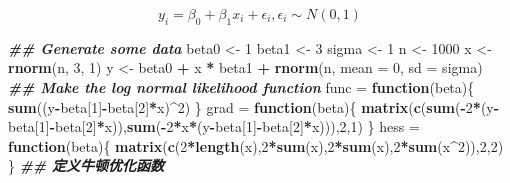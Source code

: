 \documentclass[
]{book}
\newenvironment{Shaded}{\begin{snugshade}}{\end{snugshade}}
\newcommand{\AttributeTok}[1]{\textcolor[rgb]{0.13,0.29,0.53}{#1}}
\newcommand{\ControlFlowTok}[1]{\textcolor[rgb]{0.13,0.29,0.53}{\textbf{#1}}}
\newcommand{\DecValTok}[1]{\textcolor[rgb]{0.00,0.00,0.81}{#1}}
\newcommand{\DocumentationTok}[1]{\textcolor[rgb]{0.56,0.35,0.01}{\textbf{\textit{#1}}}}
\newcommand{\FunctionTok}[1]{\textcolor[rgb]{0.13,0.29,0.53}{\textbf{#1}}}
\newcommand{\NormalTok}[1]{#1}
\newcommand{\OtherTok}[1]{\textcolor[rgb]{0.56,0.35,0.01}{#1}}
\newcommand{\SpecialCharTok}[1]{\textcolor[rgb]{0.81,0.36,0.00}{\textbf{#1}}}
\begin{document}
\begin{enumerate}
  \[
  y_i = \beta_0 + \beta_1x_i+\epsilon_i,\epsilon_i\sim N(0,1)
  \]

\begin{Shaded}
\begin{Highlighting}[]
\DocumentationTok{\#\# Generate some data}
\NormalTok{beta0 }\OtherTok{\textless{}{-}} \DecValTok{1}
\NormalTok{beta1 }\OtherTok{\textless{}{-}} \DecValTok{3}
\NormalTok{sigma }\OtherTok{\textless{}{-}} \DecValTok{1}
\NormalTok{n }\OtherTok{\textless{}{-}} \DecValTok{1000}
\NormalTok{x }\OtherTok{\textless{}{-}} \FunctionTok{rnorm}\NormalTok{(n, }\DecValTok{3}\NormalTok{, }\DecValTok{1}\NormalTok{)}
\NormalTok{y }\OtherTok{\textless{}{-}}\NormalTok{ beta0 }\SpecialCharTok{+}\NormalTok{ x }\SpecialCharTok{*}\NormalTok{ beta1 }\SpecialCharTok{+} \FunctionTok{rnorm}\NormalTok{(n, }\AttributeTok{mean =} \DecValTok{0}\NormalTok{, }\AttributeTok{sd =}\NormalTok{ sigma)}
\DocumentationTok{\#\# Make the log normal likelihood function}
\NormalTok{func }\OtherTok{=} \ControlFlowTok{function}\NormalTok{(beta)\{}
  \FunctionTok{sum}\NormalTok{((y}\SpecialCharTok{{-}}\NormalTok{beta[}\DecValTok{1}\NormalTok{]}\SpecialCharTok{{-}}\NormalTok{beta[}\DecValTok{2}\NormalTok{]}\SpecialCharTok{*}\NormalTok{x)}\SpecialCharTok{\^{}}\DecValTok{2}\NormalTok{)}
\NormalTok{\}}
\NormalTok{grad }\OtherTok{=} \ControlFlowTok{function}\NormalTok{(beta)\{}
  \FunctionTok{matrix}\NormalTok{(}\FunctionTok{c}\NormalTok{(}\FunctionTok{sum}\NormalTok{(}\SpecialCharTok{{-}}\DecValTok{2}\SpecialCharTok{*}\NormalTok{(y}\SpecialCharTok{{-}}\NormalTok{beta[}\DecValTok{1}\NormalTok{]}\SpecialCharTok{{-}}\NormalTok{beta[}\DecValTok{2}\NormalTok{]}\SpecialCharTok{*}\NormalTok{x)),}\FunctionTok{sum}\NormalTok{(}\SpecialCharTok{{-}}\DecValTok{2}\SpecialCharTok{*}\NormalTok{x}\SpecialCharTok{*}\NormalTok{(y}\SpecialCharTok{{-}}\NormalTok{beta[}\DecValTok{1}\NormalTok{]}\SpecialCharTok{{-}}\NormalTok{beta[}\DecValTok{2}\NormalTok{]}\SpecialCharTok{*}\NormalTok{x))),}\DecValTok{2}\NormalTok{,}\DecValTok{1}\NormalTok{)}
\NormalTok{\}}
\NormalTok{hess }\OtherTok{=} \ControlFlowTok{function}\NormalTok{(beta)\{}
  \FunctionTok{matrix}\NormalTok{(}\FunctionTok{c}\NormalTok{(}\DecValTok{2}\SpecialCharTok{*}\FunctionTok{length}\NormalTok{(x),}\DecValTok{2}\SpecialCharTok{*}\FunctionTok{sum}\NormalTok{(x),}\DecValTok{2}\SpecialCharTok{*}\FunctionTok{sum}\NormalTok{(x),}\DecValTok{2}\SpecialCharTok{*}\FunctionTok{sum}\NormalTok{(x}\SpecialCharTok{\^{}}\DecValTok{2}\NormalTok{)),}\DecValTok{2}\NormalTok{,}\DecValTok{2}\NormalTok{)}
\NormalTok{\}}
\DocumentationTok{\#\# 定义牛顿优化函数}

\end{Highlighting}
\end{Shaded}
\end{enumerate}
\end{document}
